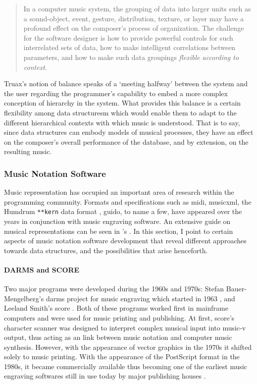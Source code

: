 	\begin{quote}
		In a computer music system, the grouping of data into larger units such as a sound-object, event, gesture, distribution, texture, or layer may have a profound effect on the composer's process of organization. The challenge for the software designer is how to provide powerful controls for such interrelated sets of data, how to make intelligent correlations between parameters, and how to make such data groupings \textit{flexible according to context}. \im \parencite[157]{Emm86:The}
	\end{quote}

	Truax's notion of balance speaks of a `meeting halfway' between the system and the user regarding the programmer's capability to embed a more complex conception of hierarchy in the system. What provides this balance is a certain flexibility among data structuresm which would enable them to adapt to the different hierarchical contexts with which music is understood. That is to say, since data structures can embody models of musical processes, they have an effect on the composer's overall performance of the database, and by extension, on the resulting music. 

\subsubsection{Music Notation Software}
\label{applications:notation}

Music representation has occupied an important area of research within the programming community. Formats and specifications such as \gls{midi}, \gls{musicxml}, the Humdrum \texttt{**kern} data format \parencite{DBLP:conf/ismir/Sapp05}, \gls{guido}, to name a few, have appeared over the years in conjunction with music engraving software. An extensive guide on musical representations can be seen in \citeauthor{Selfridge-Field:1997:BMH:275928}'s  \parencite{Selfridge-Field:1997:BMH:275928}. In this section, I point to certain aspects of music notation software development that reveal different approaches towards data structures, and the possibilities that arise henceforth.

\paragraph{DARMS and SCORE}
Two major programs were developed during the 1960s and 1970s: Stefan Bauer-Mengelberg's \gls{darms} project for music engraving which started in 1963 \parencite{icmc/bbp2372.1983.002, 10.2307/30204239}, and Leeland Smith's  \gls{score} \parencite{smith1971}. Both of these programs worked first in mainframe computers and were used for music printing and publishing. At first, \gls{score}'s character scanner was designed to interpret complex musical input into \gls{music-v} output, thus acting as an link between music notation and computer music synthesis. However, with the appearance of vector graphics in the 1970s it shifted solely to music printing.  With the appearance of the PostScript format in the 1980s, it became commercially available thus becoming one of the earliest music engraving softwares still in use today by major publishing houses \parencite{scoremus}. 

